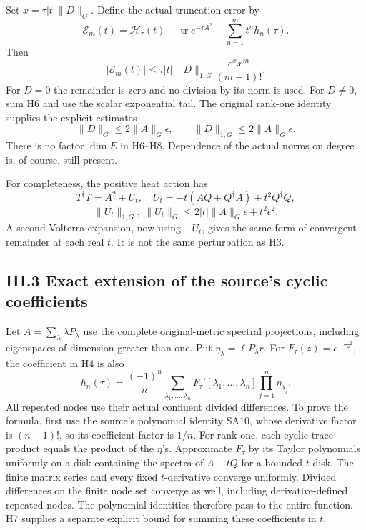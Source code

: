 Set \(x=\tau|t|\|D\|_G\). Define the actual truncation error by \[
\mathcal E_m(t)=\mathcal H_\tau(t)-\operatorname{tr}e^{-\tau A^2}
-\sum_{n=1}^m t^nh_n(\tau).
\] Then \[
\boxed{|\mathcal E_m(t)|\le\tau|t|\|D\|_{1,G}
\frac{e^x x^m}{(m+1)!}.}
\tag{H7}
\] For \(D=0\) the remainder is zero and no division by its norm is
used. For \(D\ne0\), sum H6 and use the scalar exponential tail. The
original rank-one identity supplies the explicit estimates \[
\|D\|_G\le2\|A\|_G\epsilon,
\qquad \|D\|_{1,G}\le2\|A\|_G\epsilon.
\tag{H8}
\] There is no factor \(\dim E\) in H6--H8. Dependence of the actual
norms on degree is, of course, still present.

For completeness, the positive heat action has \[
T^\dagger T=A^2+U_t,
\quad U_t=-t(AQ+Q^\dagger A)+t^2Q^\dagger Q,
\] \[
\|U_t\|_{1,G},\ \|U_t\|_G
\le2|t|\|A\|_G\epsilon+t^2\epsilon^2.
\tag{H9}
\] A second Volterra expansion, now using \(-U_t\), gives the same form
of convergent remainder at each real \(t\). It is not the same
perturbation as H3.

\subsection{III.3 Exact extension of the source's cyclic
coefficients}\label{iii.3-exact-extension-of-the-sources-cyclic-coefficients}

Let \(A=\sum_\lambda\lambda P_\lambda\) use the complete original-metric
spectral projections, including eigenspaces of dimension greater than
one. Put \(\eta_\lambda=\ell P_\lambda r\). For
\(F_\tau(z)=e^{-\tau z^2}\), the coefficient in H4 is also \[
\boxed{
h_n(\tau)=\frac{(-1)^n}{n}
\sum_{\lambda_1,\ldots,\lambda_n}
F_\tau'[\lambda_1,\ldots,\lambda_n]
\prod_{j=1}^n\eta_{\lambda_j}.
}
\tag{H10}
\] All repeated nodes use their actual confluent divided differences. To
prove the formula, first use the source's polynomial identity SA10,
whose derivative factor is \((n-1)!\), so its coefficient factor is
\(1/n\). For rank one, each cyclic trace product equals the product of
the \(\eta\)'s. Approximate \(F_\tau\) by its Taylor polynomials
uniformly on a disk containing the spectra of \(A-tQ\) for a bounded
\(t\)-disk. The finite matrix series and every fixed \(t\)-derivative
converge uniformly. Divided differences on the finite node set converge
as well, including derivative-defined repeated nodes. The polynomial
identities therefore pass to the entire function. H7 supplies a separate
explicit bound for summing these coefficients in \(t\).

